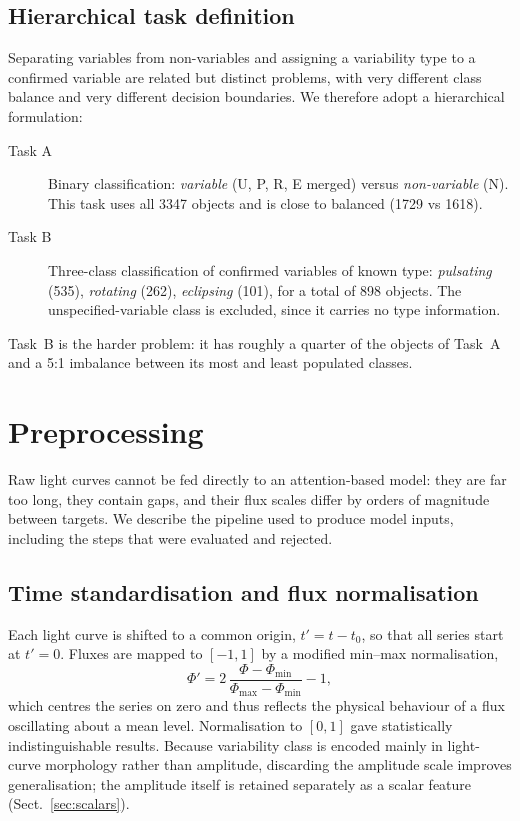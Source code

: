 \documentclass{aa}
\begin{document}
    \subsection{Hierarchical task definition}

    Separating variables from non-variables and assigning a variability type to a confirmed
    variable are related but distinct problems, with very different class balance and very
    different decision boundaries. We therefore adopt a hierarchical formulation:

    \begin{description}
        \item[Task A] Binary classification: \emph{variable} (U, P, R, E merged) versus
        \emph{non-variable} (N). This task uses all \num{3347} objects and is close to
        balanced (\num{1729} vs \num{1618}).
        \item[Task B] Three-class classification of confirmed variables of known type:
        \emph{pulsating} (535), \emph{rotating} (262), \emph{eclipsing} (101), for a total
        of 898 objects. The unspecified-variable class is excluded, since it carries no
        type information.
    \end{description}

    Task~B is the harder problem: it has roughly a quarter of the objects of Task~A and a
    5:1 imbalance between its most and least populated classes.



    \section{Preprocessing}
    \label{sec:preproc}

    Raw light curves cannot be fed directly to an attention-based model: they are far too
    long, they contain gaps, and their flux scales differ by orders of magnitude between
    targets. We describe the pipeline used to produce model inputs, including the steps that
    were evaluated and rejected.

    \subsection{Time standardisation and flux normalisation}

    Each light curve is shifted to a common origin, $t' = t - t_0$, so that all series start
    at $t'=0$. Fluxes are mapped to $[-1,1]$ by a modified min--max normalisation,
    \begin{equation}
        \Phi' = 2\,\frac{\Phi - \Phi_{\min}}{\Phi_{\max} - \Phi_{\min}} - 1 ,
    \end{equation}
    which centres the series on zero and thus reflects the physical behaviour of a flux
    oscillating about a mean level. Normalisation to $[0,1]$ gave statistically
    indistinguishable results. Because variability class is encoded mainly in light-curve
    morphology rather than amplitude, discarding the amplitude scale improves
    generalisation; the amplitude itself is retained separately as a scalar feature
    (Sect.~\ref{sec:scalars}).
\end{document}
